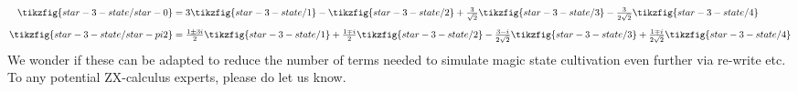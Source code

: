 \documentclass[a4paper,onecolumn,11pt,accepted=2026-06-10]{quantumarticle}
\begin{document}
\begin{align}
	\label{decomp/star-3-state/0} 
	\tikzfig{star-3-state/star-0}  &=  \textstyle{
	3   \tikzfig{star-3-state/1}   -  
	\tikzfig{star-3-state/2}   +  
	\frac{3}{\sqrt{2}}   \tikzfig{star-3-state/3}   -  
	\frac{3}{2\sqrt{2}}   \tikzfig{star-3-state/4}}
	\\[5pt]
	\label{decomp/star-3-state/pi2} 
	\tikzfig{star-3-state/star-pi2}  &=  \textstyle{
	\frac{1 \pm 3i}{2}   \tikzfig{star-3-state/1}   +  
	\frac{1 \mp i}{2}   \tikzfig{star-3-state/2}   -  
	\frac{3-i}{2\sqrt{2}}   \tikzfig{star-3-state/3}   +  
	\frac{1 \mp i}{2\sqrt{2}}   \tikzfig{star-3-state/4}}
\end{align} 
We wonder if these can be adapted to reduce the number of terms needed to simulate magic state cultivation even further via re-write etc. To any potential ZX-calculus experts, please do let us know.
\end{document}
